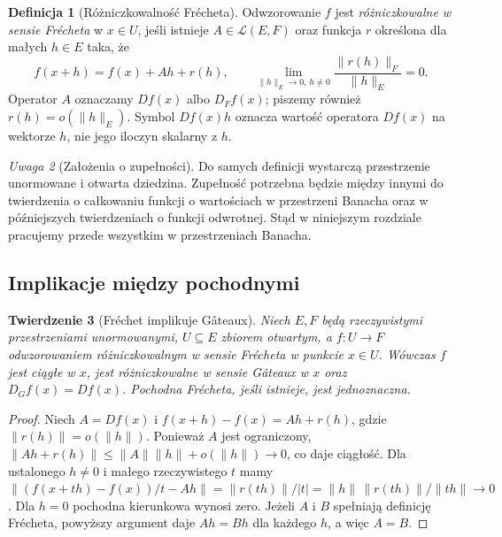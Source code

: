\documentclass[11pt,a4paper]{article}
\numberwithin{equation}{section}
\theoremstyle{plain}
\newtheorem{twierdzenie}{Twierdzenie}[section]
\theoremstyle{definition}
\newtheorem{definicja}[twierdzenie]{Definicja}
\theoremstyle{remark}
\newtheorem{uwaga}[twierdzenie]{Uwaga}
\begin{document}
\begin{definicja}[Różniczkowalność Frécheta]
\label{def:frechet14}
Odwzorowanie $f$ jest \emph{różniczkowalne w sensie Frécheta} w $x\in U$, jeśli istnieje $A\in\mathcal L(E,F)$ oraz funkcja $r$ określona dla małych $h\in E$ taka, że
\[
f(x+h)=f(x)+Ah+r(h),\qquad
\lim_{\|h\|_E\to0,\,h\ne0}\frac{\|r(h)\|_F}{\|h\|_E}=0.
\]
Operator $A$ oznaczamy $Df(x)$ albo $D_Ff(x)$; piszemy również $r(h)=o(\|h\|_E)$. Symbol $Df(x)h$ oznacza wartość operatora $Df(x)$ na wektorze $h$, nie jego iloczyn skalarny z $h$.
\end{definicja}

\begin{uwaga}[Założenia o zupełności]
\label{rem:completeness14}
Do samych definicji wystarczą przestrzenie unormowane i otwarta dziedzina. Zupełność potrzebna będzie między innymi do twierdzenia o całkowaniu funkcji o wartościach w przestrzeni Banacha oraz w późniejszych twierdzeniach o funkcji odwrotnej. Stąd w niniejszym rozdziale pracujemy przede wszystkim w przestrzeniach Banacha.
\end{uwaga}

\subsection{Implikacje między pochodnymi}

\begin{twierdzenie}[Fréchet implikuje Gâteaux]
\label{thm:frechet-implies-gateaux14}
Niech $E,F$ będą rzeczywistymi przestrzeniami unormowanymi, $U\subseteq E$ zbiorem otwartym, a $f:U\to F$ odwzorowaniem różniczkowalnym w sensie Frécheta w punkcie $x\in U$. Wówczas $f$ jest ciągłe w $x$, jest różniczkowalne w sensie Gâteaux w $x$ oraz $D_Gf(x)=Df(x)$. Pochodna Frécheta, jeśli istnieje, jest jednoznaczna.
\end{twierdzenie}
\begin{proof}
Niech $A=Df(x)$ i $f(x+h)-f(x)=Ah+r(h)$, gdzie $\|r(h)\|=o(\|h\|)$. Ponieważ $A$ jest ograniczony, $\|Ah+r(h)\|\le\|A\|\|h\|+o(\|h\|)\to0$, co daje ciągłość. Dla ustalonego $h\ne0$ i małego rzeczywistego $t$ mamy
$\|(f(x+th)-f(x))/t-Ah\|=\|r(th)\|/|t|=\|h\|\,\|r(th)\|/\|th\|\to0$.
Dla $h=0$ pochodna kierunkowa wynosi zero. Jeżeli $A$ i $B$ spełniają definicję Frécheta, powyższy argument daje $Ah=Bh$ dla każdego $h$, a więc $A=B$.
\end{proof}
\end{document}
